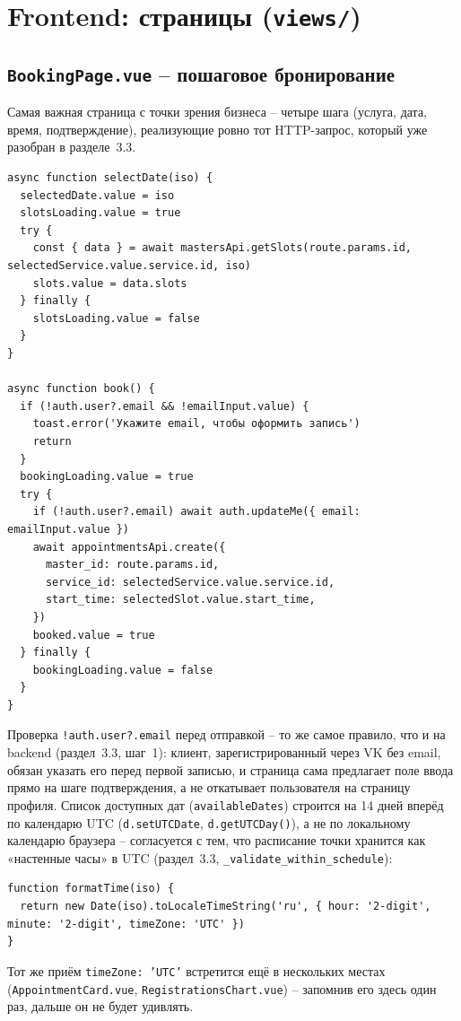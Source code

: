 \section{Frontend: страницы (\texttt{views/})}

\subsection{\texttt{BookingPage.vue} -- пошаговое бронирование}

Самая важная страница с точки зрения бизнеса -- четыре шага (услуга,
дата, время, подтверждение), реализующие ровно тот HTTP-запрос, который
уже разобран в разделе~3.3.
\begin{verbatim}
async function selectDate(iso) {
  selectedDate.value = iso
  slotsLoading.value = true
  try {
    const { data } = await mastersApi.getSlots(route.params.id, selectedService.value.service.id, iso)
    slots.value = data.slots
  } finally {
    slotsLoading.value = false
  }
}

async function book() {
  if (!auth.user?.email && !emailInput.value) {
    toast.error('Укажите email, чтобы оформить запись')
    return
  }
  bookingLoading.value = true
  try {
    if (!auth.user?.email) await auth.updateMe({ email: emailInput.value })
    await appointmentsApi.create({
      master_id: route.params.id,
      service_id: selectedService.value.service.id,
      start_time: selectedSlot.value.start_time,
    })
    booked.value = true
  } finally {
    bookingLoading.value = false
  }
}
\end{verbatim}
Проверка \texttt{!auth.user?.email} перед отправкой -- то же самое
правило, что и на backend (раздел~3.3, шаг~1): клиент, зарегистрированный
через VK без email, обязан указать его перед первой записью, и страница
сама предлагает поле ввода прямо на шаге подтверждения, а не откатывает
пользователя на страницу профиля. Список доступных дат
(\texttt{availableDates}) строится на 14 дней вперёд по календарю UTC
(\texttt{d.setUTCDate}, \texttt{d.getUTCDay()}), а не по локальному
календарю браузера -- согласуется с тем, что расписание точки хранится
как «настенные часы» в UTC (раздел~3.3, \texttt{_validate_within_schedule}):
\begin{verbatim}
function formatTime(iso) {
  return new Date(iso).toLocaleTimeString('ru', { hour: '2-digit', minute: '2-digit', timeZone: 'UTC' })
}
\end{verbatim}
Тот же приём \texttt{timeZone: 'UTC'} встретится ещё в нескольких
местах (\texttt{AppointmentCard.vue}, \texttt{RegistrationsChart.vue}) --
запомнив его здесь один раз, дальше он не будет удивлять.

